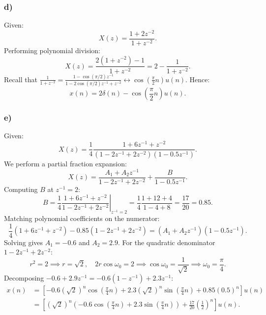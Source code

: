 \documentclass[12pt,a4paper]{article}
\begin{document}
\subsubsection*{d)}
Given:
\begin{equation}
    X(z) = \frac{1 + 2z^{-2}}{1 + z^{-2}}.
\end{equation}
Performing polynomial division:
\begin{equation}
    X(z) = \frac{2(1 + z^{-2}) - 1}{1 + z^{-2}} = 2 - \frac{1}{1 + z^{-2}}.
\end{equation}
Recall that $\frac{1}{1 + z^{-2}} = \frac{1 - \cos(\pi/2) z^{-1}}{1 - 2\cos(\pi/2) z^{-1} + z^{-2}} \longleftrightarrow \cos\left(\frac{\pi}{2} n\right) u(n)$. Hence:
\begin{equation}
    x(n) = 2\delta(n) - \cos\left(\frac{\pi}{2} n\right) u(n).
\end{equation}

\subsubsection*{e)}
Given:
\begin{equation}
    X(z) = \frac{1}{4} \frac{1 + 6z^{-1} + z^{-2}}{(1 - 2z^{-1} + 2z^{-2})(1 - 0.5z^{-1})}.
\end{equation}
We perform a partial fraction expansion:
\begin{equation}
    X(z) = \frac{A_1 + A_2 z^{-1}}{1 - 2z^{-1} + 2z^{-2}} + \frac{B}{1 - 0.5z^{-1}}.
\end{equation}
Computing $B$ at $z^{-1} = 2$:
\begin{equation}
    B = \left. \frac{1}{4} \frac{1 + 6z^{-1} + z^{-2}}{1 - 2z^{-1} + 2z^{-2}} \right|_{z^{-1} = 2} = \frac{1}{4} \frac{1 + 12 + 4}{1 - 4 + 8} = \frac{17}{20} = 0.85.
\end{equation}
Matching polynomial coefficients on the numerator:
\begin{equation*}
    \frac{1}{4}(1 + 6z^{-1} + z^{-2}) - 0.85(1 - 2z^{-1} + 2z^{-2}) = (A_1 + A_2 z^{-1})(1 - 0.5z^{-1}).
\end{equation*}
Solving gives $A_1 = -0.6$ and $A_2 = 2.9$. For the quadratic denominator $1 - 2z^{-1} + 2z^{-2}$:
\begin{equation*}
    r^2 = 2 \implies r = \sqrt{2}, \quad 2r\cos\omega_0 = 2 \implies \cos\omega_0 = \frac{1}{\sqrt{2}} \implies \omega_0 = \frac{\pi}{4}.
\end{equation*}
Decomposing $-0.6 + 2.9z^{-1} = -0.6(1 - z^{-1}) + 2.3 z^{-1}$:
\begin{align}
    x(n) &= \left[ -0.6 (\sqrt{2})^n \cos\left(\frac{\pi}{4} n\right) + 2.3 (\sqrt{2})^n \sin\left(\frac{\pi}{4} n\right) + 0.85 (0.5)^n \right] u(n) \nonumber \\
         &= \left[ (\sqrt{2})^n \left( -0.6 \cos\left(\frac{\pi}{4} n\right) + 2.3 \sin\left(\frac{\pi}{4} n\right) \right) + \frac{17}{20}\left(\frac{1}{2}\right)^n \right] u(n).
\end{align}
\end{document}

